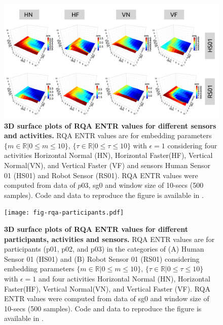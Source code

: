 \documentclass[fleqn,10pt]{wlscirep}
\begin{document}
\begin{figure}[ht]
\centering
\includegraphics[width=1.0\textwidth]{fig-rqa-sensors-activities.pdf}
    \caption{
	{\bf 3D surface plots of RQA ENTR values for different sensors and activities.}
	RQA ENTR values are for embedding parameters
	$ \{ m \in \mathbb{R} | 0 \le m \le 10  \}$,
	$ \{ \tau \in \mathbb{R} | 0 \le \tau \le 10  \}$
	with $\epsilon = 1 $ considering four activities 
	Horizontal Normal (HN), Horizontal Faster(HF), Vertical Normal(VN), and 
	Vertical Faster (VF) and sensors Human Sensor 01 (HS01) and 
	Robot Sensor (RS01).
	RQA ENTR values were computed from data of $p03$, sg0 and 
	window size of 10-secs (500 samples).
	Code and data to reproduce the figure is available in \cite{srep2020}.
       }
\label{fig:3dRQAENTR_sensoractivities}
\end{figure}

\begin{figure}[ht]
\centering
\texttt{[image: fig-rqa-participants.pdf]}
    \caption{
	{\bf 3D surface plots of RQA ENTR values for different participants, activities and sensors.}
	RQA ENTR values are for participants (p01, p02, and p03) 
	in the categories of 
	(A) Human Sensor 01 (HS01) and 
	(B) Robot Sensor 01 (RS01)
	considering embedding parameters
	$ \{ m \in \mathbb{R} | 0 \le m \le 10  \}$,
	$ \{ \tau \in \mathbb{R} | 0 \le \tau \le 10  \}$
	with $\epsilon = 1$ and four activities 
	Horizontal Normal (HN), Horizontal Faster(HF), Vertical Normal(VN), and 
	Vertical Faster (VF).
	RQA ENTR values were computed from data of sg0 and window size of 10-secs (500 samples).
	Code and data to reproduce the figure is available in \cite{srep2020}.
       }
\label{fig:3dRQAENTR_participantsactivities}
\end{figure}
\end{document}
